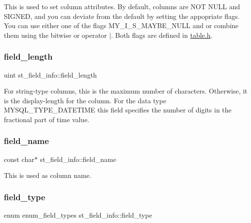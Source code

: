 This is used to set column attributes. By default, columns are {\ttfamily N\+OT} {\ttfamily N\+U\+LL} and {\ttfamily S\+I\+G\+N\+ED}, and you can deviate from the default by setting the appopriate flags. You can use either one of the flags {\ttfamily M\+Y\+\_\+\+I\+\_\+\+S\+\_\+\+M\+A\+Y\+B\+E\+\_\+\+N\+U\+LL} and  or combine them using the bitwise or operator {\ttfamily }$\vert$. Both flags are defined in \mbox{\hyperlink{table_8h_source}{table.\+h}}. \mbox{\label{structst__field__info_a82de297dd0e4835ada40570f1a0822f9}} 
\subsubsection{\texorpdfstring{field\+\_\+length}{field\_length}}
{\footnotesize\ttfamily uint st\+\_\+field\+\_\+info\+::field\+\_\+length}

For string-\/type columns, this is the maximum number of characters. Otherwise, it is the \textquotesingle{}display-\/length\textquotesingle{} for the column. For the data type M\+Y\+S\+Q\+L\+\_\+\+T\+Y\+P\+E\+\_\+\+D\+A\+T\+E\+T\+I\+ME this field specifies the number of digits in the fractional part of time value. \mbox{\label{structst__field__info_aad2046c4548bf5eafe4bdbeeb7298232}} 
\subsubsection{\texorpdfstring{field\+\_\+name}{field\_name}}
{\footnotesize\ttfamily const char$\ast$ st\+\_\+field\+\_\+info\+::field\+\_\+name}

This is used as column name. \mbox{\label{structst__field__info_a70226cb26db7fb2d7bbde155db4c6829}} 
\subsubsection{\texorpdfstring{field\+\_\+type}{field\_type}}
{\footnotesize\ttfamily enum enum\+\_\+field\+\_\+types st\+\_\+field\+\_\+info\+::field\+\_\+type}

